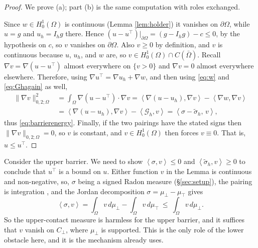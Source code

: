 \documentclass[12pt]{amsart}
\numberwithin{equation}{section}
\theoremstyle{plain}
\theoremstyle{definition}
\theoremstyle{remark}
\newcommand{\Om}{\Omega}
\newcommand{\dOm}{\partial\Omega}
\newcommand{\Cbot}{C_\bot}
\newcommand{\Ih}{I_h}
\newcommand{\Gh}{\mathcal{G}_h}
\begin{document}
\begin{proof}
We prove (a); part (b) is the same computation with roles exchanged.

Since $w \in H_0^1(\Om)$ is continuous (Lemma \ref{lem:holder}) it vanishes on $\dOm$, while $u = g$ and $u_h = \Ih g$ there.  Hence $(u - u^\top)|_{\dOm} = (g - \Ih g) - c \le 0$, by the hypothesis on $c$, so $v$ vanishes on $\dOm$.  Also $v \ge 0$ by definition, and $v$ is continuous because $u$, $u_h$, and $w$ are, so $v\in H_0^1(\Om) \cap C(\bar\Om)$.  Recall $\nabla v = \nabla(u-u^\top)$ almost everywhere on $\{v > 0\}$ and $\nabla v = 0$ almost everywhere elsewhere.  Therefore, using $\nabla u^\top = \nabla u_h + \nabla w$, and then using \eqref{eq:w} and \eqref{eq:Ghagain} as well,
\begin{align*}
\|\nabla v\|_{0,2;\Om}^2 &= \int_\Om \nabla(u - u^\top)\cdot\nabla v = \left<\nabla(u-u_h),\nabla v\right> - \left<\nabla w, \nabla v\right> \\
  &= \left<\nabla(u-u_h),\nabla v\right> - \left<\Gh,v\right> = \left<\sigma - \tilde\sigma_h,\,v\right>,
\end{align*}
thus \eqref{eq:barrierenergy}.  Finally, if the two pairings have the stated signs then $\|\nabla v\|_{0,2;\Om} = 0$, so $v$ is constant, and $v \in H_0^1(\Om)$ then forces $v \equiv 0$.  That is, $u \le u^\top$.
\end{proof}

Consider the upper barrier.  We need to show $\left<\sigma,v\right> \le 0$ and $\left<\tilde\sigma_h,v\right> \ge 0$ to conclude that $u^\top$ is a bound on $u$.  Either function $v$ in the Lemma is continuous and non-negative, so, $\sigma$ being a signed Radon measure (\S \ref{sec:setup}), the pairing is integration \cite[Theorem 6.9]{KinderlehrerStampacchia1980}, and the Jordan decomposition $\sigma = \mu_\bot - \mu_\top$ gives
\begin{equation}
\label{eq:sigmapairing}
  \left<\sigma,v\right> = \int_\Om v\,d\mu_\bot - \int_\Om v\,d\mu_\top \ \le\ \int_\Om v\,d\mu_\bot .
\end{equation}
So the upper-contact measure is harmless for the upper barrier, and it suffices that $v$ vanish on $\Cbot$, where $\mu_\bot$ is supported.  This is the only role of the lower obstacle here, and it is the mechanism \cite{NSV03} already uses.
\end{document}
